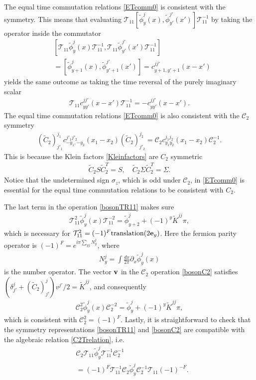 The equal time commutation relations \eqref{ETcomm0} is consistent with the \AFTR symmetry. This means that evaluating $\mathcal{T}_{11}\left[\tilde\phi_y^j(x),\tilde\phi_{y'}^{j'}(x')\right]\mathcal{T}_{11}^{-1}$ by taking the \AFTR operator inside the commutator \begin{align}&\left[\mathcal{T}_{11}\tilde\phi_y^j(x)\mathcal{T}_{11}^{-1},\mathcal{T}_{11}\tilde\phi_{y'}^{j'}(x')\mathcal{T}_{11}^{-1}\right]\nonumber\\&=\left[\tilde\phi_{y+1}^j(x),\tilde\phi_{y'+1}^{j'}(x')\right]=c^{jj'}_{y+1,y'+1}(x-x')\end{align} yields the same outcome as taking the time reversal of the purely imaginary scalar \begin{align}\mathcal{T}_{11}c^{jj'}_{yy'}(x-x')\mathcal{T}_{11}^{-1}=-c^{jj'}_{yy'}(x-x').\end{align} The equal time commutation relations \eqref{ETcomm0} is also consistent with the $\mathcal{C}_2$ symmetry \begin{align}(\tilde{C}_2)^{j_1}_{j'_1}c^{j'_1j'_2}_{-y_1,-y_2}(x_1-x_2)(\tilde{C}_2)^{j_2}_{j'_2}=\mathcal{C}_2c^{j_1j_2}_{y_1y_2}(x_1-x_2)\mathcal{C}_2^{-1}.\label{ETcommC2consistent}\end{align} This is because the Klein factors \eqref{Kleinfactors} are $C_2$ symmetric \begin{align}\tilde{C}_2S\tilde{C}_2^T=S,\quad\tilde{C}_2\Sigma\tilde{C}_2^T=\Sigma.\end{align} Notice that the undetermined sign $\sigma_z$, which is odd under $\mathcal{C}_2$, in \eqref{ETcomm0} is essential for the equal time commutation relations to be consistent with $C_2$.

The last term in the \AFTR operation \eqref{bosonTR11} makes sure \begin{align}\mathcal{T}_{11}^2\tilde\phi_y^j(x)\mathcal{T}_{11}^{-2}=\tilde\phi_{y+2}^j+(-1)^y\tilde{K}^{jj}\pi,\end{align} which is necessary for $\mathcal{T}^2_{11}=(-1)^F\mathrm{translation}(2{\bf e}_y)$. Here the fermion parity operator is $(-1)^F=e^{i\pi\sum_{yj}N_y^j}$, where \begin{align}N_y^j=\int\frac{dx}{2\pi}\partial_x\tilde\phi_y^j(x)\label{numop}\end{align} is the number operator. The vector ${\bf v}$ in the $\mathcal{C}_2$ operation \eqref{bosonC2} satisfies $(\delta^j_{j'}+(\tilde{C}_2)^j_{j'})v^{j'}/2=\tilde{K}^{jj}$, and consequently \begin{align}\mathcal{C}_{2}^2\tilde\phi_y^j(x)\mathcal{C}_{2}^{-2}=\tilde\phi_y^j+(-1)^y\tilde{K}^{jj}\pi,\end{align} which is consistent with $\mathcal{C}_2^2=(-1)^F$. Lastly, it is straightforward to check that the symmetry representations \eqref{bosonTR11} and \eqref{bosonC2} are compatible with the algebraic relation \eqref{C2Trelation}, i.e. \begin{align}&\mathcal{C}_2\mathcal{T}_{11}\tilde\phi^j_y\mathcal{T}_{11}^{-1}\mathcal{C}_2^{-1}\\&=(-1)^F\mathcal{T}_{11}^{-1}\mathcal{C}_2\tilde\phi^j_y\mathcal{C}_2^{-1}\mathcal{T}_{11}(-1)^{-F}.\nonumber\end{align}

